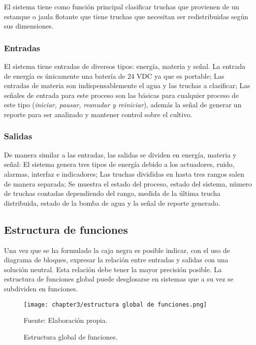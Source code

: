 El sistema tiene como función principal clasificar truchas que provienen de un estanque o jaula flotante que tiene truchas que necesitan ser redistribuidas según sus dimensiones.

\subsubsection{Entradas}

El sistema tiene entradas de diversos tipos: energía, materia y señal. La entrada de energía es únicamente una batería de 24 VDC ya que es portable; Las entradas de materia son indispensablemente el agua y las truchas a clasificar; Las señales de entrada para este proceso son las básicas para cualquier proceso de este tipo (\textit{iniciar, pausar, reanudar y reiniciar}), además la señal de generar un reporte para ser analizado y mantener control sobre el cultivo.

\subsubsection{Salidas}

De manera similar a las entradas, las salidas se dividen en energía, materia y señal: El sistema genera tres tipos de energía debido a los actuadores, ruido, alarmas, interfaz e indicadores; Las truchas divididas en hasta tres rangos salen de manera separada; Se muestra el estado del proceso, estado del sistema, número de truchas contadas dependiendo del rango, medida de la última trucha distribuida, estado de la bomba de agua y la señal de reporte generado.

\subsection{Estructura de funciones}

Una vez que se ha formulado la caja negra es posible indicar, con el uso de diagrama de bloques, expresar la relación entre entradas y salidas con una solución neutral. Esta relación debe tener la mayor precisión posible. La estructura de funciones global puede desglosarse en sistemas que a su vez se subdividen en funciones.\cite[p.~169-181]{Pahl2007}

\newpage
\thispagestyle{mylandscape}
\begin{landscape}
	\begin{figure}[H]
		\centering
		\texttt{[image: chapter3/estructura global de funciones.png]}
		\caption{Estructura global de funciones.}
		\begin{myflushleftportland}			
			Fuente: Elaboración propia.
		\end{myflushleftportland}
		\label{fig:estructura global de funciones}
	\end{figure}
\end{landscape}


